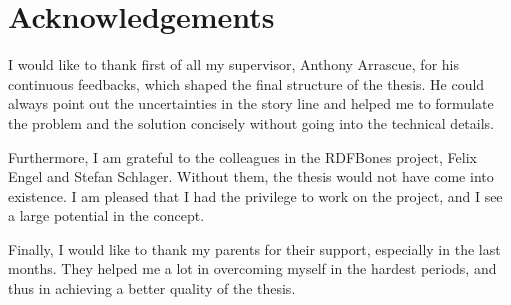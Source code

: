 \newpage
\chapter*{Acknowledgements}

I would like to thank first of all my supervisor, Anthony Arrascue, for his continuous feedbacks, which shaped the final structure of the thesis. He could always point out the uncertainties in the story line and helped me to formulate the problem and the solution concisely without going into the technical details.

Furthermore, I am grateful to the colleagues in the RDFBones project, Felix Engel and Stefan Schlager. Without them, the thesis would not have come into existence. I am pleased that I had the privilege to work on the project, and I see a large potential in the concept.

Finally, I would like to thank my parents for their support, especially in the last months. They helped me a lot in overcoming myself in the hardest periods, and thus in achieving a better quality of the thesis.
